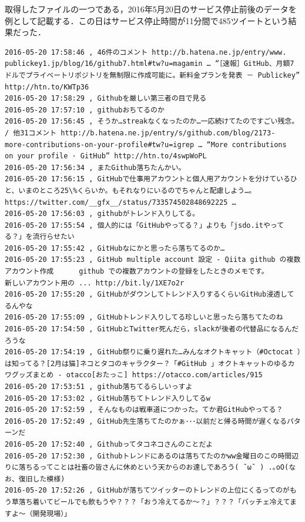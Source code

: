 \newpage
取得したファイルの一つである，2016年5月20日のサービス停止前後のデータを例として記載する．この日はサービス停止時間が11分間で485ツイートという結果だった．
\\
\begin{verbatim}
2016-05-20 17:58:46 , 46件のコメント http://b.hatena.ne.jp/entry/www.
publickey1.jp/blog/16/github7.html#tw?u=magamin … “［速報］GitHub、月額7ドルでプライベートリポジトリを無制限に作成可能に。新料金プランを発表 － Publickey” http://htn.to/KWTp36 
2016-05-20 17:58:29 , Githubを厳しい第三者の目で見る
2016-05-20 17:57:10 , githubおちてるのか
2016-05-20 17:56:45 , そうか…streakなくなったのか…一応続けてたのですごい残念。 / 他31コメント http://b.hatena.ne.jp/entry/s/github.com/blog/2173-
more-contributions-on-your-profile#tw?u=igrep … “More contributions 
on your profile · GitHub” http://htn.to/4swpWoPL 
2016-05-20 17:56:34 , またGithub落ちたんかい。
2016-05-20 17:56:15 , GitHubで仕事用アカウントと個人用アカウントを分けているひと、いまのところ25\%くらいか。もそれなりにいるのでちゃんと配慮しよう…。  https://twitter.com/__gfx__/status/733574502848692225 …
2016-05-20 17:56:03 , githubがトレンド入りしてる。
2016-05-20 17:55:54 , 個人的には「GitHubやってる？」よりも「jsdo.itやってる？」を流行らせたい
2016-05-20 17:55:42 , GitHubなにかと思ったら落ちてるのか…
2016-05-20 17:55:23 , GitHub multiple account 設定 - Qiita github の複数アカウント作成      github での複数アカウントの登録をしたときのメモです。        新しいアカウント用の ... http://bit.ly/1XE7o2r 
2016-05-20 17:55:20 , GitHubがダウンしてトレンド入りするくらいGitHub浸透してるんやな
2016-05-20 17:55:09 , GitHubトレンド入りしてる珍しいと思ったら落ちてたのね
2016-05-20 17:54:50 , GitHubとTwitter死んだら，slackが後者の代替品になるんだろうな
2016-05-20 17:54:19 , GitHub祭りに乗り遅れた…みんなオクトキャット（#Octocat ）は知ってる？[2月は猫]ネコとタコのキャラクター？「#GitHub 」オクトキャットのゆるカワグッズまとめ - otacco[おたっこ] https://otacco.com/articles/915 
2016-05-20 17:53:51 , github落ちてるらしいっすよ
2016-05-20 17:53:02 , GitHub落ちてトレンド入りしてるw
2016-05-20 17:52:59 , そんなものは戦車道につかった。てか君GitHubやってる？
2016-05-20 17:52:49 , GitHub先生落ちてたのかぁ･･･以前だと帰る時間が遅くなるパターンだ
2016-05-20 17:52:40 , Githubってタコネコさんのことだよ
2016-05-20 17:52:30 , Githubトレンドにあるのは落ちてたのかww金曜日のこの時間辺りに落ちるってことは社畜の皆さんに休めという天からのお達しであろう( ˘ω˘ ) .｡oO(なお、復旧した模様)
2016-05-20 17:52:26 , GitHubが落ちてツイッターのトレンドの上位にくるってのがもう草落ち着いてビールでも飲もうや？？？「おう冷えてるか〜？」？？？「バッチェ冷えてますよ〜（開発現場）」

\end{verbatim}
